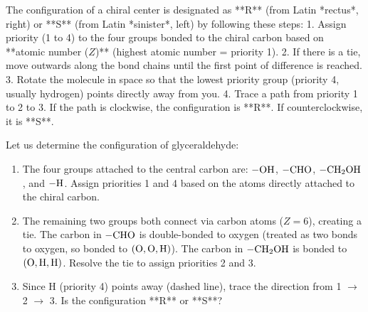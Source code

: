 \documentclass[12pt, a4paper]{book}
\begin{document}
\begin{explobox}
The configuration of a chiral center is designated as **R** (from Latin *rectus*, right) or **S** (from Latin *sinister*, left) by following these steps:
1. Assign priority (1 to 4) to the four groups bonded to the chiral carbon based on **atomic number ($Z$)** (highest atomic number = priority 1).
2. If there is a tie, move outwards along the bond chains until the first point of difference is reached.
3. Rotate the molecule in space so that the lowest priority group (priority 4, usually hydrogen) points directly away from you.
4. Trace a path from priority 1 to 2 to 3. If the path is clockwise, the configuration is **R**. If counterclockwise, it is **S**.

\problem Let us determine the configuration of glyceraldehyde:
\begin{center}
\end{center}
\begin{enumerate}[label=(\alph*), leftmargin=*]
  \item The four groups attached to the central carbon are: $-\ce{OH}$, $-\ce{CHO}$, $-\ce{CH2OH}$, and $-\ce{H}$.
        Assign priorities 1 and 4 based on the atoms directly attached to the chiral carbon.
  \item The remaining two groups both connect via carbon atoms ($Z=6$), creating a tie.
        The carbon in $-\ce{CHO}$ is double-bonded to oxygen (treated as two bonds to oxygen, so bonded to $(\ce{O}, \ce{O}, \ce{H})$). The carbon in $-\ce{CH2OH}$ is bonded to $(\ce{O}, \ce{H}, \ce{H})$.
        Resolve the tie to assign priorities 2 and 3.
  \item Since H (priority 4) points away (dashed line), trace the direction from 1 $\to$ 2 $\to$ 3. Is the configuration **R** or **S**?
\end{enumerate}
\end{explobox}
\end{document}

